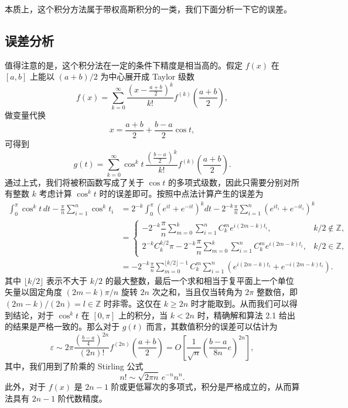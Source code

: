 本质上，这个积分方法属于带权高斯积分的一类，我们下面分析一下它的误差。

\subsection{误差分析}

值得注意的是，这个积分法在一定的条件下精度是相当高的。假定 $f(x)$ 在 $[a,b]$ 上能以 $(a+b)/2$ 为中心展开成 Taylor 级数
\[
f(x)=\sum_{k=0}^{\infty}\frac{\left(x-\frac{a+b}{2}\right)^k}{k!}
 f^{(k)}\left(\frac{a+b}{2}\right),
\]
做变量代换
\[
x=\frac{a+b}{2}+\frac{b-a}{2}\cos t,
\]
可得到
\[
g(t)=\sum_{k=0}^{\infty}\cos^k t\,\frac{\left(\frac{b-a}{2}\right)^k}{k!}
 f^{(k)}\left(\frac{a+b}{2}\right).
\]
通过上式，我们将被积函数写成了关于 $\cos t$ 的多项式级数，因此只需要分别对所有整数 $k$ 考虑计算 $\cos^k t$ 时的误差即可。按照中点法计算产生的误差为
\[
\begin{aligned}
\int_0^\pi\cos^k t\,dt-\frac\pi n\sum_{i=1}^{n}\cos^k t_i
&=2^{-k}\int_0^\pi(e^{it}+e^{-it})^kdt
 -2^{-k}\frac\pi n\sum_{i=1}^{n}(e^{it_i}+e^{-it_i})^k\\
&=\begin{cases}
-2^{-k}\dfrac\pi n\displaystyle\sum_{m=0}^{k}\sum_{i=1}^{n}C_k^m e^{i(2m-k)t_i},&k/2\notin\mathbb Z,\\[1.0ex]
2^{-k}C_k^{k/2}\pi-2^{-k}\dfrac\pi n\displaystyle\sum_{m=0}^{k}\sum_{i=1}^{n}C_k^m e^{i(2m-k)t_i},&k/2\in\mathbb Z,
\end{cases}\\
&=-2^{-k}\frac\pi n\sum_{m=0}^{\lfloor k/2\rfloor-1}C_k^m\sum_{i=1}^{n}
\left(e^{i(2m-k)t_i}+e^{-i(2m-k)t_i}\right).
\end{aligned}
\]
其中 $\lfloor k/2\rfloor$ 表示不大于 $k/2$ 的最大整数，最后一个求和相当于复平面上一个单位矢量以固定角度 $(2m-k)\pi/n$ 旋转 $2n$ 次之和，当且仅当转角为 $2\pi$ 整数倍，即 $(2m-k)/(2n)=l\in\mathbb Z$ 时非零。这仅在 $k\ge2n$ 时才能取到。从而我们可以得到结论，对于 $\cos^k t$ 在 $[0,\pi]$ 上的积分，当 $k<2n$ 时，精确解和算法 2.1 给出的结果是严格一致的。那么对于 $g(t)$ 而言，其数值积分的误差可以估计为
\[
\varepsilon\sim 2\pi\frac{\left(\frac{b-a}{4}\right)^{2n}}{(2n)!}
 f^{(2n)}\left(\frac{a+b}{2}\right)
 =O\left[\frac1{\sqrt n}\left(\frac{b-a}{8n}e\right)^{2n}\right],
\]
其中，我们用到了阶乘的 Stirling 公式
\begin{equation}
n!\sim\sqrt{2\pi n}\,e^{-n}n^n.
\tag{2.3.9}
\end{equation}
此外，对于 $f(x)$ 是 $2n-1$ 阶或更低幂次的多项式，积分是严格成立的，从而算法具有 $2n-1$ 阶代数精度。

